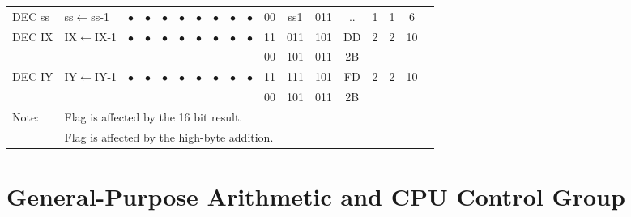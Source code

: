 \documentclass[oneside,a4paper]{book}
\begin{document}
{\begin{tabular}{llcccccccccccccccl}
		DEC ss\instrt & 
			ss$\leftarrow$ss-1 &
			$\bullet$ & 
				$\bullet$ & 
				$\bullet$ & 
				$\bullet$ & 
				$\bullet$ & 
				$\bullet$ & 
				$\bullet$ & 
				$\bullet$ &
			00 & ss1 & 011 & 
			.. & 1 & 
			1 & 6 & \instrb \\

		DEC IX\instrt & 
			IX$\leftarrow$IX-1 &
			$\bullet$ & 
				$\bullet$ & 
				$\bullet$ & 
				$\bullet$ & 
				$\bullet$ & 
				$\bullet$ & 
				$\bullet$ & 
				$\bullet$ &
			11 & 011 & 101 & 
			DD & 2 & 
			2 & 10 & \\
		\multicolumn{10}{c}{} & 00 & 101 & 011 & 2B & \instrb \\

		DEC IY\instrt & 
			IY$\leftarrow$IY-1 &
			$\bullet$ & 
				$\bullet$ & 
				$\bullet$ & 
				$\bullet$ & 
				$\bullet$ & 
				$\bullet$ & 
				$\bullet$ & 
				$\bullet$ &
			11 & 111 & 101 & 
			FD & 2 & 
			2 & 10 & \\
		\multicolumn{10}{c}{} & 00 & 101 & 011 & 2B & \instrb \\
		
		\hline

		Note:
			& \multicolumn{17}{l}{\parbox{12cm}{\footnotemark[1]Flag is affected by the 16 bit result.}}\notet \\
			& \multicolumn{17}{l}{\parbox{12cm}{\footnotemark[2]Flag is affected by the high-byte addition.}}\noteb \\
			
		\hline

	\end{tabular}
}


\section{General-Purpose Arithmetic and CPU Control Group}
\end{document}
